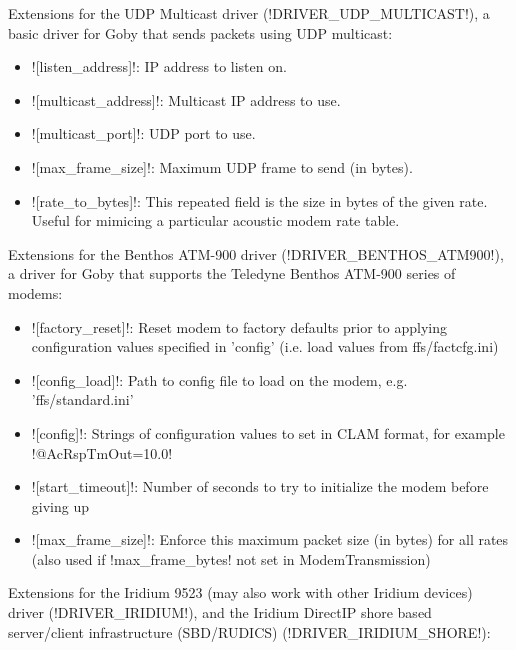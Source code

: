 Extensions for the UDP Multicast driver (!DRIVER_UDP_MULTICAST!), a basic driver for Goby that sends packets using UDP multicast:
\resetbvlinenumber

\begin{itemize}
\item ![listen_address]!: IP address to listen on.
\item ![multicast_address]!: Multicast IP address to use.
\item ![multicast_port]!: UDP port to use.
\item ![max_frame_size]!: Maximum UDP frame to send (in bytes).
\item ![rate_to_bytes]!: This repeated field is the size in bytes of the given rate. Useful for mimicing a particular acoustic modem rate table.
\end{itemize} 


Extensions for the Benthos ATM-900 driver (!DRIVER_BENTHOS_ATM900!), a driver for Goby that supports the Teledyne Benthos ATM-900 series of modems:
\resetbvlinenumber

\begin{itemize}
\item ![factory_reset]!: Reset modem to factory defaults prior to applying configuration values specified in 'config' (i.e. load values from ffs/factcfg.ini) 
\item ![config_load]!: Path to config file to load on the modem, e.g. 'ffs/standard.ini'
\item ![config]!: Strings of configuration values to set in CLAM format, for example !@AcRspTmOut=10.0!
\item ![start_timeout]!: Number of seconds to try to initialize the modem before giving up
\item ![max_frame_size]!: Enforce this maximum packet size (in bytes) for all rates (also used if !max_frame_bytes! not set in ModemTransmission)
\end{itemize} 


Extensions for the Iridium 9523 (may also work with other Iridium devices) driver (!DRIVER_IRIDIUM!), and the Iridium DirectIP shore based server/client infrastructure (SBD/RUDICS) (!DRIVER_IRIDIUM_SHORE!):
\resetbvlinenumber


